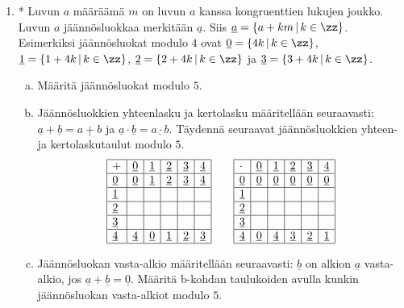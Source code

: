 \begin{enumerate}
\item * %
Luvun $a$ määräämä  $m$ on luvun $a$ kanssa kongruenttien lukujen joukko. Luvun $a$ jäännösluokkaa merkitään $\underline{a}$. Siis $\underline{a} = \{a + km\, |\, k\in \zz\}$. Esimerkiksi jäännösluokat modulo $4$ ovat $\underline{0}=\{4k\, |\, k\in \zz\}$, $\underline{1}=\{1+4k\, |\, k\in \zz\}$, $\underline{2}=\{2+4k\, |\, k\in \zz\}$ ja $\underline{3}=\{3+4k\, |\, k\in \zz\}$.
\begin{enumerate}[a)]
\item Määritä jäännösluokat modulo $5$.
\item Jäännösluokkien yhteenlasku ja kertolasku määritellään seuraavasti: $\underline{a} + \underline{b} = \underline{a + b}$ ja $\underline{a} \cdot \underline{b} = \underline{a\cdot b}$. Täydennä seuraavat jäännösluokkien yhteen- ja kertolaskutaulut modulo $5$.
\[
\begin{array}{|l|l|l|l|l|l|}
\hline
+& \underline{0} & \underline{1} & \underline{2} & \underline{3} & \underline{4} \\ \hline
\underline{0} & \underline{0} & \underline{1} & \underline{2} &  \underline{3} & \underline{4}  
\\ \hline
 \underline{1} &&&&& \\ \hline
 \underline{2} &&&&& \\ \hline
 \underline{3} &&&&& \\ \hline
\underline{4} & \underline{4} & \underline{0} & \underline{1} &  \underline{2} & \underline{3}  
\\ \hline
\end{array}
\qquad
\begin{array}{|l|l|l|l|l|l|}
\hline
\cdot& \underline{0} & \underline{1} & \underline{2} & \underline{3} & \underline{4} \\ \hline
\underline{0} & \underline{0} & \underline{0} & \underline{0} &  \underline{0} & \underline{0}  
\\ \hline
 \underline{1} &&&&& \\ \hline
 \underline{2} &&&&& \\ \hline
 \underline{3} &&&&& \\ \hline
\underline{4} & \underline{0} & \underline{4} & \underline{3} &  \underline{2} & \underline{1}  
\\ \hline
\end{array}
\]
\item Jäännösluokan vasta-alkio määritellään seuraavasti: $\underline{b}$ on alkion $\underline{a}$ vasta-alkio, jos $\underline{a} + \underline{b} = \underline{0}$. Määritä b-kohdan  taulukoiden avulla kunkin jäännösluokan vasta-alkiot modulo $5$.

\end{enumerate}
\end{enumerate}
